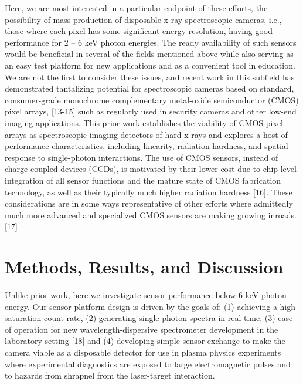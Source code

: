 Here, we are most interested in a particular endpoint of these efforts,
the possibility of mass-production of disposable x-ray spectroscopic
cameras, i.e., those where each pixel has some significant energy
resolution, having good performance for 2 -- 6 keV photon energies. The
ready availability of such sensors would be beneficial in several of the
fields mentioned above while also serving as an easy test platform for
new applications and as a convenient tool in education. We are not the
first to consider these issues, and recent work in this subfield has
demonstrated tantalizing potential for spectroscopic cameras based on
standard, consumer-grade monochrome complementary metal-oxide
semiconductor (CMOS) pixel
arrays, {[}13-15{]} such as
regularly used in security cameras and other low-end imaging
applications. This prior work establishes the viability of CMOS pixel
arrays as spectroscopic imaging detectors of hard x rays and explores a
host of performance characteristics, including linearity,
radiation-hardness, and spatial response to single-photon interactions.
The use of CMOS sensors, instead of charge-coupled devices (CCDs), is
motivated by their lower cost due to chip-level integration of all
sensor functions and the mature state of CMOS fabrication technology, as
well as their typically much higher radiation
hardness {[}16{]}\emph{.} These
considerations are in some ways representative of other efforts where
admittedly much more advanced and specialized CMOS sensors are making
growing inroads. {[}17{]}

\section{Methods, Results, and Discussion}
Unlike prior work, here we investigate sensor performance below 6 keV
photon energy. Our sensor platform design is driven by the goals of: (1)
achieving a high saturation count rate, (2) generating single-photon
spectra in real time, (3) ease of operation for new
wavelength-dispersive spectrometer development in the laboratory
setting {[}18{]} and (4)
developing simple sensor exchange to make the camera viable as a
disposable detector for use in plasma physics experiments where
experimental diagnostics are exposed to large electromagnetic pulses and
to hazards from shrapnel from the laser-target interaction.

